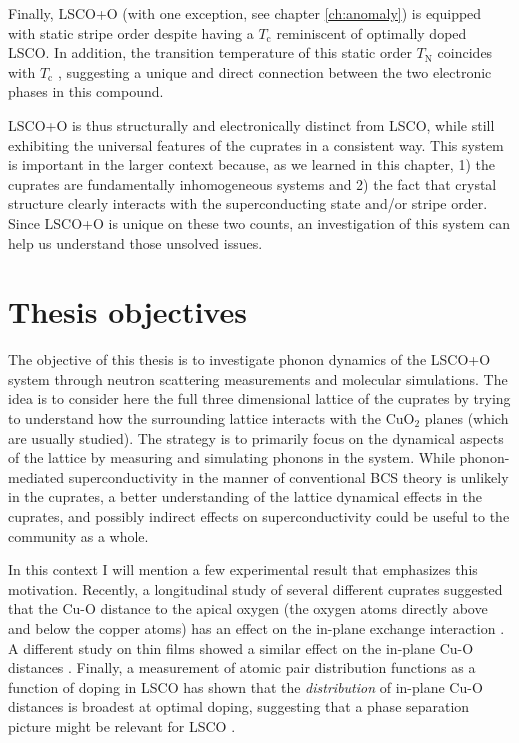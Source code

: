 Finally, LSCO+O (with one exception, see chapter \ref{ch:anomaly}) is equipped with static stripe order despite having a $T_\text{c}$ reminiscent of optimally doped LSCO. In addition, the transition temperature of this static order $T_\text{N}$ coincides with $T_\text{c}$ \cite{Udby2013}, suggesting a unique and direct connection between the two electronic phases in this compound.

LSCO+O is thus structurally and electronically distinct from LSCO, while still exhibiting the universal features of the cuprates in a consistent way. This system is important in the larger context because, as we learned in this chapter, 1) the cuprates are fundamentally inhomogeneous systems and 2) the fact that crystal structure clearly interacts with the superconducting state and/or stripe order. Since LSCO+O is unique on these two counts, an investigation of this system can help us understand those unsolved issues.

\section{Thesis objectives}
The objective of this thesis is to investigate phonon dynamics of the LSCO+O system through neutron scattering measurements and molecular simulations. The idea is to consider here the full three dimensional lattice of the cuprates by trying to understand how the surrounding lattice interacts with the CuO$_2$ planes (which are usually studied). The strategy is to primarily focus on the dynamical aspects of the lattice by measuring and simulating phonons in the system. While phonon-mediated superconductivity in the manner of conventional BCS theory is unlikely in the cuprates, a better understanding of the lattice dynamical effects in the cuprates, and possibly indirect effects on superconductivity could be useful to the community as a whole.

In this context I will mention a few experimental result that emphasizes this motivation. Recently, a longitudinal study of several different cuprates suggested that the Cu-O distance to the apical oxygen (the oxygen atoms directly above and below the copper atoms) has an effect on the in-plane exchange interaction \cite{Peng2017}. A different study on thin films showed a similar effect on the in-plane Cu-O distances \cite{Ivashko2019}. Finally, a measurement of atomic pair distribution functions as a function of doping in LSCO has shown that the \emph{distribution} of in-plane Cu-O distances is broadest at optimal doping, suggesting that a phase separation picture might be relevant for LSCO \cite{Bozin2000}.

